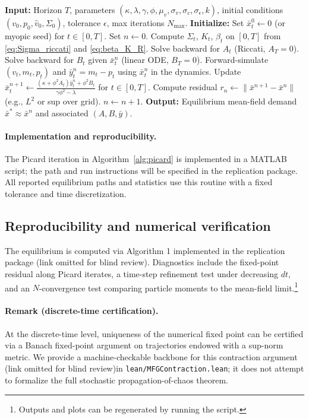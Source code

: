 \begin{algorithm}[t]
\caption{Picard iteration for LQG mean-field equilibrium}
\label{alg:picard}
\begin{algorithmic}[1]
\STATE \textbf{Input:} Horizon $T$, parameters $(\kappa,\lambda,\gamma,\phi,\mu_v,\sigma_v,\sigma_c,\sigma_\epsilon,k)$, initial conditions $(v_0,p_0,\hat v_0,\Sigma_0)$, tolerance $\epsilon$, max iterations $N_{\max}$.
\STATE \textbf{Initialize:} Set $\bar x^0_t \gets 0$ (or myopic seed) for $t\in[0,T]$. Set $n\gets 0$.
\REPEAT
\STATE Compute $\Sigma_t$, $K_t$, $\beta_t$ on $[0,T]$ from \eqref{eq:Sigma_riccati} and \eqref{eq:beta_K_R}.
\STATE Solve backward for $A_t$ (Riccati, $A_T=0$).
\STATE Solve backward for $B_t$ given $\bar x^n_t$ (linear ODE, $B_T=0$).
\STATE Forward-simulate $(v_t,m_t,p_t)$ and $\bar y^n_t = m_t - p_t$ using $\bar x^n_t$ in the dynamics.
\STATE Update $\bar x^{n+1}_t \gets \frac{(\kappa+\phi^2 A_t)\bar y^n_t + \phi^2 B_t}{\gamma\phi^2-\lambda}$ for $t\in[0,T]$.
\STATE Compute residual $r_n \gets \|\bar x^{n+1}-\bar x^n\|$ (e.g., $L^2$ or sup over grid).
\STATE $n \gets n+1$.
\STATE \textbf{Output:} Equilibrium mean-field demand $\bar x^* \approx \bar x^n$ and associated $(A,B,\bar y)$.
\end{algorithmic}
\end{algorithm}

\paragraph{Implementation and reproducibility.}
The Picard iteration in Algorithm~\ref{alg:picard} is implemented in a MATLAB script; the path and run instructions will be specified in the replication package. All reported equilibrium paths and statistics use this routine with a fixed tolerance and time discretization.

\subsection{Reproducibility and numerical verification}
The equilibrium is computed via Algorithm 1 implemented in \ifjeicblind the replication package (link omitted for blind review)\else {}\fi.
Diagnostics include the fixed-point residual along Picard iterates, a time-step refinement test under decreasing $dt$, and an $N$-convergence test comparing particle moments to the mean-field limit.\footnote{Outputs and plots can be regenerated by running the script.}

\paragraph{Remark (discrete-time certification).}
At the discrete-time level, uniqueness of the numerical fixed point can be certified via a Banach fixed-point argument on trajectories endowed with a sup-norm metric.
We provide a machine-checkable backbone for this contraction argument \ifjeicblind (link omitted for blind review)\else in \texttt{lean/MFGContraction.lean}\fi; it does not attempt to formalize the full stochastic propagation-of-chaos theorem.
